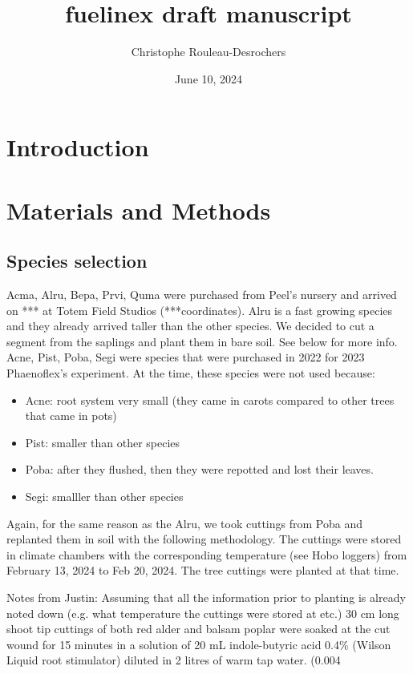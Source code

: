 \documentclass{article}
\title{fuelinex draft manuscript}
\author[1*$\dag$]{Christophe Rouleau-Desrochers}
\affil[1]{UBC}
\date{June 10, 2024}
\begin{document}
\maketitle

\begin{abstract}
\end{abstract}

\section{Introduction}

\section{Materials and Methods}
\subsection{Species selection}
Acma, Alru, Bepa, Prvi, Quma were purchased from Peel's nursery and arrived on *** at Totem Field Studios (***coordinates). Alru is a fast growing species and they already arrived taller than the other species. We decided to cut a segment from the saplings and plant them in bare soil. See below for more info. 
Acne, Pist, Poba, Segi were species that were purchased in 2022 for 2023 Phaenoflex's experiment. At the time, these species were not used because:
\begin{itemize}
	\item Acne: root system very small (they came in carots compared to other trees that came in pots)
	\item Pist: smaller than other species
	\item Poba: after they flushed, then they were repotted and lost their leaves.
	\item Segi: smalller than other species
\end{itemize}
Again, for the same reason as the Alru, we took cuttings from Poba and replanted them in soil with the following methodology. The cuttings were stored in climate chambers with the corresponding temperature (see Hobo loggers) from February 13, 2024 to Feb 20, 2024. The tree cuttings were planted at that time. 
\par Notes from Justin: Assuming that all the information prior to planting is already noted down (e.g. what temperature the cuttings were stored at etc.)
30 cm long shoot tip cuttings of both red alder and balsam poplar were soaked at the cut wound for 15 minutes in a solution of 20 mL indole-butyric acid 0.4\% (Wilson Liquid root stimulator) diluted in 2 litres of warm tap water. (0.004%
\end{document}

